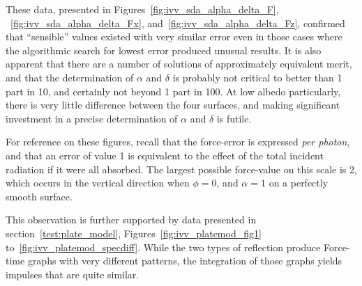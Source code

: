 \begin{description}
      These data, presented in Figures~\ref{fig:ivv_sda_alpha_delta_F},
     ~\ref{fig:ivv_sda_alpha_delta_Fx}, and~\ref{fig:ivv_sda_alpha_delta_Fz},
      confirmed that ``sensible''
      values existed with very similar error even in those cases where the
      algorithmic search for lowest error produced unusual results. It is
      also apparent that there are a number of solutions of approximately
      equivalent merit, and that the determination of  $\alpha $ and  $\delta
      $ is probably not critical to better than 1 part in 10, and certainly
      not beyond 1 part in 100. At low albedo particularly, there is very little
      difference between the four surfaces, and making significant investment in a
      precise determination of $\alpha $ and  $\delta $ is futile.

      For
      reference on these figures, recall that the force{}-error is expressed
      \textit{per photon}, and that an error of value 1 is
      equivalent to the effect of the total incident radiation if it were all
      absorbed.
      The largest possible force-value on this scale is 2, which
      occurs in the vertical direction when $\phi =0$,
      and $\alpha =1$ on a perfectly smooth surface.

      This observation is further supported by data presented in
      section~\ref{test:plate_model},
      Figures~\ref{fig:ivv_platemod_fig1} to~\ref{fig:ivv_platemod_specdiff}.
      While the two
      types of reflection produce Force-time graphs with very different
      patterns, the integration of those graphs yields impulses that are quite
      similar.


\end{description}
